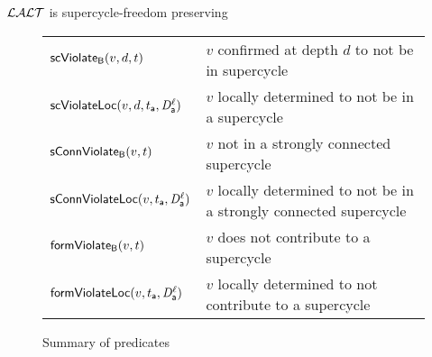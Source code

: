 \bt \label{thm:LAO.SC-free-preserving}
$\mathcal{LALT}$ is supercycle-freedom preserving
\et
{}



\begin{figure}[ht]

\begin{tabular}{|l|l|}
\hline
$\mathsf{scViolate}_{\mathsf{B}}(v,d,t)$  & $v$ confirmed at depth $d$ to not be in supercycle\\ 
$\mathsf{scViolateLoc}(v,d,t_{\mathsf{a}},\mathit{D}_{\mathsf{a}}^{\ell})$ & $v$ locally determined to not be in a supercycle\\

$\mathsf{sConnViolate}_{\mathsf{B}}(v,t)$ & $v$ not in a strongly connected supercycle \\

$\mathsf{sConnViolateLoc}(v,t_{\mathsf{a}},\mathit{D}_{\mathsf{a}}^{\ell})$ & $v$ locally determined to not be in a strongly connected supercycle \\

$\mathsf{formViolate}_{\mathsf{B}}(v,t)$ & $v$ does not contribute to a supercycle\\

$\mathsf{formViolateLoc}(v,t_{\mathsf{a}},\mathit{D}_{\mathsf{a}}^{\ell})$ & $v$ locally determined to not contribute to a supercycle\\

\hline
\end{tabular}

\caption{Summary of predicates}
\label{fig:summaryPredicates}
\end{figure}


